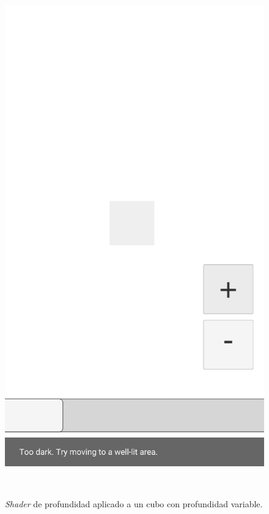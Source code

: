\begin{figure}[htbp]
\begin{minipage}{0.3\textwidth}
        \includegraphics[scale=0.15]{Images/Shaders/profundidad (3).png}\\
    \end{minipage}\\
    \caption[\textit{Shader} de profundidad aplicado a un cubo con profundidad variable]{\textit{Shader} de profundidad aplicado a un cubo con profundidad variable.}
    \label{fig:shaderprofprueba1}
\end{figure}

